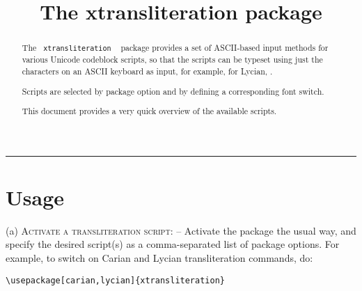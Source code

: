 \documentclass{article}
\title{The xtransliteration package}
\author{}
\date{}
\newcommand\tentry[5]{%
#1 &
\metac{#2} &
\metacb{#3} &
#4 &
#5{#4} \\

}
\newcommand\sep{\vspace{1.2ex}\hskip 0.3\textwidth\leaders\hrule width 0.3\textwidth\hskip 0.3\textwidth\vspace{1.8ex}}
\begin{document}
\maketitle
\begin{abstract}
The ~\texttt{xtransliteration} ~ package provides a set of \textsc{ASCII}-based input methods for various Unicode codeblock scripts, so that the scripts can be typeset using just the characters on an \textsc{ASCII} keyboard as input, for example, for Lycian, .
\par Scripts are selected by package option and by defining a corresponding font switch.
\par This document provides a very quick overview of the available scripts.

\end{abstract}

\sep




\section{Usage}
(a) \textsc{Activate a transliteration script}: -- Activate the package the usual way, and specify the desired script(s) as a comma-separated list of package options. For example, to switch on Carian and Lycian transliteration commands, do:

\begin{verbatim}
\usepackage[carian,lycian]{xtransliteration}
\end{verbatim}
\end{document}
